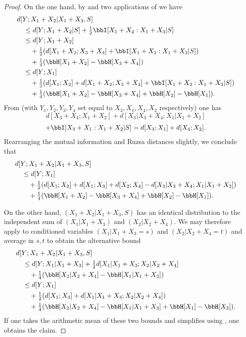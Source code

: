 \begin{proof}\leanok
  On the one hand, by  and two applications of  we have
  \begin{align*}
  &d[Y;X_1+X_2|X_1 + X_3, S] \\
  &\quad \leq d[Y;X_1+X_2|S] + \tfrac{1}{2} \bbI[X_1 + X_2 : X_1 + X_3|S] \\
  &\quad \leq d[Y;X_1+X_2]\\
  &\qquad + \tfrac{1}{2} (d[X_1+X_2;X_3+X_4] + \bbI[X_1 + X_2 : X_1 + X_3|S])\\
  &\qquad + \tfrac{1}{4} (\bbH[X_1+X_2] - \bbH[X_3+X_4])\\
  &\quad \leq d[Y;X_1] \\
  &\qquad + \tfrac{1}{2} (d[X_1;X_2] + d[X_1+X_2;X_3+X_4] + \bbI[X_1 + X_2 : X_1 + X_3|S])\\
  &\qquad + \tfrac{1}{4} (\bbH[X_1+X_2] - \bbH[X_3+X_4] + \bbH[X_2] - \bbH[X_1]).
  \end{align*}
  From  (with $Y_1,Y_2,Y_3,Y_4$ set equal to $X_3, X_1, X_4, X_2$ respectively) one has
  $$ d[X_3+X_4; X_1+X_2] + d[X_3|X_3+X_4; X_1|X_1+X_2] $$
  $$ + \bbI[X_3 + X_1 : X_1 + X_2|S] = d[X_3;X_1] + d[X_4;X_2].$$
Rearranging the mutual information and Ruzsa distances slightly, we conclude that
\begin{align*}
  &d[Y;X_1+X_2|X_1 + X_3, S] \\
  &\quad \leq d[Y;X_1] \\
  &\qquad + \tfrac{1}{2} (d[X_1;X_2] + d[X_1;X_3] + d[X_2;X_4] - d[X_3|X_3+X_4; X_1|X_1+X_2])\\
  &\qquad + \tfrac{1}{4} (\bbH[X_1+X_2] - \bbH[X_3+X_4] + \bbH[X_2] - \bbH[X_1]).
  \end{align*}



  On the other hand, $(X_1+X_2|X_1 + X_3, S)$ has an identical distribution to the independent sum of $(X_1|X_1+X_3)$ and $(X_2|X_2+X_4)$.  We may therefore apply  to conditioned variables $(X_1|X_1+X_3=s)$ and $(X_2|X_2+X_4=t)$ and average in $s,t$ to
  obtain the alternative bound
  \begin{align*}
  &  d[Y;X_1+X_2|X_1 + X_3, S] \\
  &\quad \leq d[Y;X_1|X_1+X_3] + \tfrac{1}{2} d[X_1|X_1+X_3; X_2|X_2+X_4] \\
  &\qquad + \tfrac{1}{4} (\bbH[X_2|X_2+X_4] - \bbH[X_1|X_1+X_3]) \\
  &\quad  \leq d[Y;X_1] \\
  &\qquad + \tfrac{1}{2} (d[X_1;X_3] + d[X_1|X_1+X_3;X_2|X_2+X_4])\\
  &\qquad + \tfrac{1}{4} (\bbH[X_2|X_2+X_4] - \bbH[X_1|X_1+X_3] + \bbH[X_1] - \bbH[X_3]).
  \end{align*}
  If one takes the arithmetic mean of these two bounds and simplifies using , one obtains the claim.
\end{proof}

